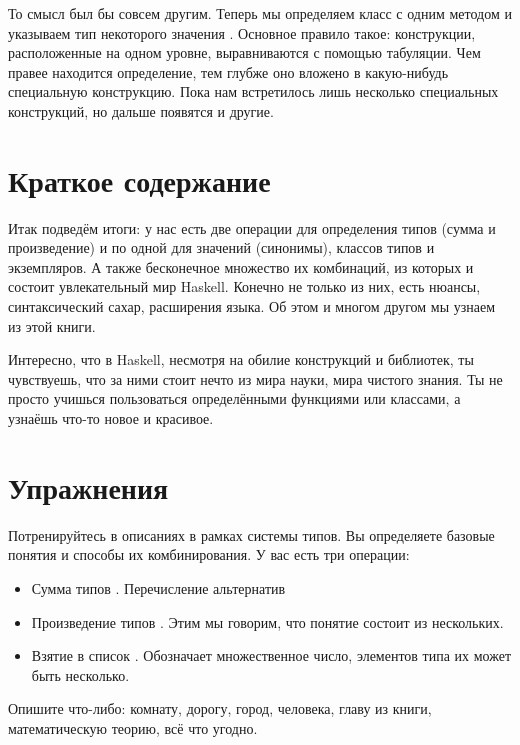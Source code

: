 То смысл был бы совсем другим. Теперь мы определяем
класс  с одним методом \In{==} и указываем
тип некоторого значения \In{(/=)}. Основное правило
такое: конструкции, расположенные на одном уровне, 
выравниваются с помощью табуляции. Чем правее находится определение,
тем глубже оно вложено в какую-нибудь специальную
конструкцию. Пока нам встретилось лишь несколько специальных
конструкций, но дальше появятся и другие. 

\section{Краткое содержание}

Итак подведём итоги: у нас есть две операции для определения типов
(сумма и произведение) и по одной для значений (синонимы), 
классов типов и экземпляров. А также
бесконечное множество их комбинаций, из которых и состоит
увлекательный мир Haskell. Конечно не только из них, есть
нюансы, синтаксический сахар, расширения языка. Об этом
и многом другом мы узнаем из этой книги. 

Интересно, что в Haskell, несмотря на обилие 
конструкций и библиотек, ты чувствуешь, что за ними стоит
нечто из мира науки, мира чистого знания. Ты не просто учишься 
пользоваться определёнными функциями или классами, а узнаёшь
что-то новое и красивое.

\section{Упражнения}

Потренируйтесь в описаниях в рамках системы типов.
Вы определяете базовые понятия и способы их комбинирования.
У вас есть три операции:

\begin{itemize}

\item Сумма типов . Перечисление альтернатив
            
\item Произведение типов . 
        Этим мы говорим, что понятие состоит из нескольких.

\item Взятие в список \In{[T]}. Обозначает множественное
        число, элементов типа  их может быть несколько.

\end{itemize}

Опишите что-либо: комнату, дорогу, город, человека,
главу из книги, математическую теорию, всё что угодно.

